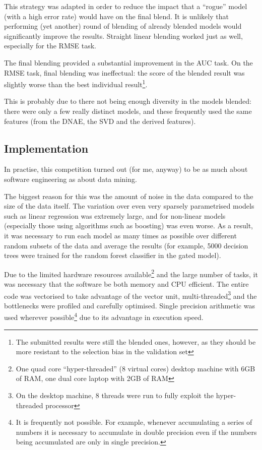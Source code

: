 \documentclass{article}
\begin{document}
This strategy was adapted in order to reduce the impact that a ``rogue'' model (with a high error rate) would have on the final blend.  It is unlikely that performing (yet another) round of blending of already blended models would significantly improve the results.  Straight linear blending worked just as well, especially for the RMSE task.

The final blending provided a substantial improvement in the AUC task.  On the RMSE task, final blending was ineffectual: the score of the blended result was slightly worse than the best individual result\footnote{The submitted results were still the blended ones, however, as they should be more resistant to the selection bias in the validation set}.

This is probably due to there not being enough diversity in the models blended: there were only a few really distinct models, and these frequently used the same features (from the DNAE, the SVD and the derived features).

\subsection{Implementation}

In practise, this competition turned out (for me, anyway) to be as much about software engineering as about data mining.

The biggest reason for this was the amount of noise in the data compared to the size of the data itself.  The variation over even very sparsely parametrised models such as linear regression was extremely large, and for non-linear models (especially those using algorithms such as boosting) was even worse.  As a result, it was necessary to run each model as many times as possible over different random subsets of the data and average the results (for example, 5000 decision trees were trained for the random forest classifier in the gated model).

Due to the limited hardware resources available\footnote{One quad core ``hyper-threaded'' (8 virtual cores) desktop machine with 6GB of RAM, one dual core laptop with 2GB of RAM} and the large number of tasks, it was necessary that the software be both memory and CPU efficient.
The entire code was vectorised to take advantage of the vector unit, multi-threaded\footnote{On the desktop machine, 8 threads were run to fully exploit the hyper-threaded processor} and the bottlenecks were profiled and carefully optimised.  Single precision arithmetic was used wherever possible\footnote{It is frequently not possible.  For example, whenever accumulating a series of numbers it is necessary to accumulate in double precision even if the numbers being accumulated are only in single precision.} due to its advantage in execution speed.
\end{document}
